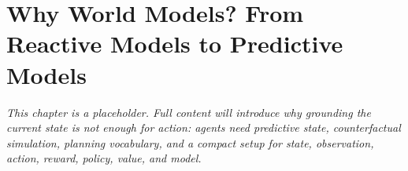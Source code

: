 \chapter{Why World Models? From Reactive Models to Predictive Models}
\label{ch:why-world-models}


\textit{This chapter is a placeholder. Full content will introduce why grounding the current state is not enough for action: agents need predictive state, counterfactual simulation, planning vocabulary, and a compact setup for state, observation, action, reward, policy, value, and model.}
